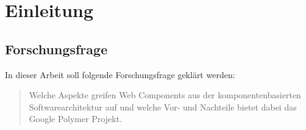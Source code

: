 \section{Einleitung}
\label{sec:1_Einführung}





\subsection{Forschungsfrage}
\label{sec:1_Forschungsfrage}
In dieser Arbeit soll folgende Forschungsfrage geklärt werden:
\begin{quote}
Welche Aspekte greifen Web Components aus der komponentenbasierten Softwarearchitektur auf und welche Vor- und Nachteile bietet dabei das Google Polymer Projekt.
\end{quote}

